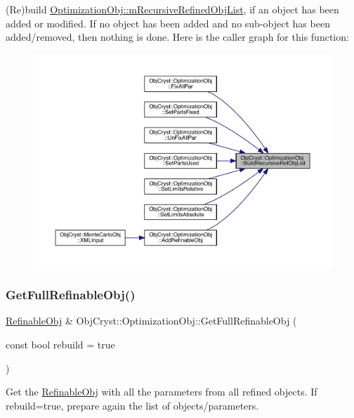 (Re)build \mbox{\hyperlink{class_obj_cryst_1_1_optimization_obj_a0e6a9e9d4d12ed73c582da36190f110f}{Optimization\+Obj\+::m\+Recursive\+Refined\+Obj\+List}}, if an object has been added or modified. If no object has been added and no sub-\/object has been added/removed, then nothing is done. Here is the caller graph for this function\+:
\nopagebreak
\begin{figure}[H]
\begin{center}
\leavevmode
\includegraphics[width=350pt]{class_obj_cryst_1_1_optimization_obj_a7c819c5f8fc52caafd97ea9d468da2be_icgraph}
\end{center}
\end{figure}
\mbox{\label{class_obj_cryst_1_1_optimization_obj_a2d88b0c8d3440cddc77f57d548420e24}} 
\subsubsection{\texorpdfstring{GetFullRefinableObj()}{GetFullRefinableObj()}}
{\footnotesize\ttfamily \mbox{\hyperlink{class_obj_cryst_1_1_refinable_obj}{Refinable\+Obj}} \& Obj\+Cryst\+::\+Optimization\+Obj\+::\+Get\+Full\+Refinable\+Obj (\begin{DoxyParamCaption}\item[{const bool}]{rebuild = {\ttfamily true} }\end{DoxyParamCaption})}

Get the \mbox{\hyperlink{class_obj_cryst_1_1_refinable_obj}{Refinable\+Obj}} with all the parameters from all refined objects. If rebuild=true, prepare again the list of objects/parameters. \mbox{\label{class_obj_cryst_1_1_optimization_obj_a3850c776ec9ede5102caf7c0aa04e558}} 
